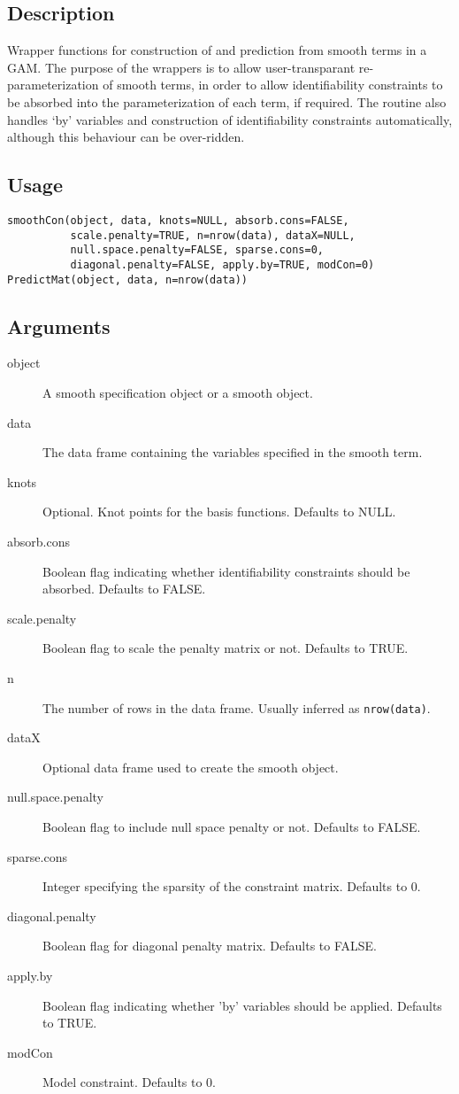 \documentclass{article}
\begin{document}
\subsection{Description}
Wrapper functions for construction of and prediction from smooth terms in a GAM. The purpose of the wrappers is to allow user-transparant re-parameterization of smooth terms, in order to allow identifiability constraints to be absorbed into the parameterization of each term, if required. The routine also handles ‘by’ variables and construction of identifiability constraints automatically, although this behaviour can be over-ridden.

\subsection{Usage}
\begin{verbatim}
smoothCon(object, data, knots=NULL, absorb.cons=FALSE,
          scale.penalty=TRUE, n=nrow(data), dataX=NULL,
          null.space.penalty=FALSE, sparse.cons=0,
          diagonal.penalty=FALSE, apply.by=TRUE, modCon=0)
PredictMat(object, data, n=nrow(data))
\end{verbatim}

\subsection{Arguments}
\begin{description}
\item[object] A smooth specification object or a smooth object.
\item[data] The data frame containing the variables specified in the smooth term.
\item[knots] Optional. Knot points for the basis functions. Defaults to NULL.
\item[absorb.cons] Boolean flag indicating whether identifiability constraints should be absorbed. Defaults to FALSE.
\item[scale.penalty] Boolean flag to scale the penalty matrix or not. Defaults to TRUE.
\item[n] The number of rows in the data frame. Usually inferred as \texttt{nrow(data)}.
\item[dataX] Optional data frame used to create the smooth object.
\item[null.space.penalty] Boolean flag to include null space penalty or not. Defaults to FALSE.
\item[sparse.cons] Integer specifying the sparsity of the constraint matrix. Defaults to 0.
\item[diagonal.penalty] Boolean flag for diagonal penalty matrix. Defaults to FALSE.
\item[apply.by] Boolean flag indicating whether 'by' variables should be applied. Defaults to TRUE.
\item[modCon] Model constraint. Defaults to 0.
\end{description}
\end{document}

